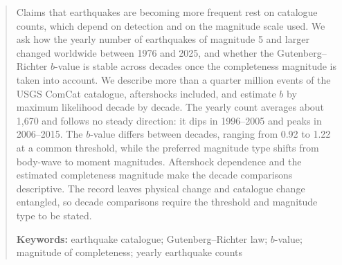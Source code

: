 \begin{abstract}
\noindent Claims that earthquakes are becoming more frequent rest on catalogue counts, which depend on detection and on the magnitude scale used. We ask how the yearly number of earthquakes of magnitude 5 and larger changed worldwide between 1976 and 2025, and whether the Gutenberg--Richter $b$-value is stable across decades once the completeness magnitude is taken into account. We describe more than a quarter million events of the USGS ComCat catalogue, aftershocks included, and estimate $b$ by maximum likelihood decade by decade. The yearly count averages about 1,670 and follows no steady direction: it dips in 1996--2005 and peaks in 2006--2015. The $b$-value differs between decades, ranging from 0.92 to 1.22 at a common threshold, while the preferred magnitude type shifts from body-wave to moment magnitudes. Aftershock dependence and the estimated completeness magnitude make the decade comparisons descriptive. The record leaves physical change and catalogue change entangled, so decade comparisons require the threshold and magnitude type to be stated.

\medskip
\noindent\textbf{Keywords:} earthquake catalogue; Gutenberg--Richter law; $b$-value; magnitude of completeness; yearly earthquake counts
\end{abstract}

